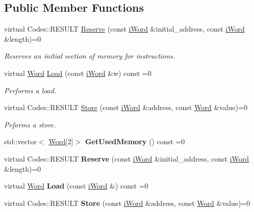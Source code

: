 \subsection*{Public Member Functions}
\begin{DoxyCompactItemize}
\item 
virtual Codes::RESULT \hyperlink{classiMemory_a27750e74d09fb473c163a4cc4c3e697b}{Reserve} (const \hyperlink{classiWord}{iWord} \&initial\_\-address, const \hyperlink{classiWord}{iWord} \&length)=0
\begin{DoxyCompactList}\small\item\em Reserves an initial section of memory for instructions. \item\end{DoxyCompactList}\item 
virtual \hyperlink{classWord}{Word} \hyperlink{classiMemory_a3352ba391fc9b69a0b8691b2d585596a}{Load} (const \hyperlink{classiWord}{iWord} \&w) const =0
\begin{DoxyCompactList}\small\item\em Performs a load. \item\end{DoxyCompactList}\item 
virtual Codes::RESULT \hyperlink{classiMemory_a2632c9999797b0799a7d6b0a59bfa91a}{Store} (const \hyperlink{classiWord}{iWord} \&address, const \hyperlink{classWord}{Word} \&value)=0
\begin{DoxyCompactList}\small\item\em Peforms a store. \item\end{DoxyCompactList}\item 
\hypertarget{classiMemory_aa9b57e00c0099963ab28489008d612e8}{
std::vector$<$ \hyperlink{classWord}{Word}\mbox{[}2\mbox{]}$>$ {\bfseries GetUsedMemory} () const =0}
\label{classiMemory_aa9b57e00c0099963ab28489008d612e8}

\item 
\hypertarget{classiMemory_a27750e74d09fb473c163a4cc4c3e697b}{
virtual Codes::RESULT {\bfseries Reserve} (const \hyperlink{classiWord}{iWord} \&initial\_\-address, const \hyperlink{classiWord}{iWord} \&length)=0}
\label{classiMemory_a27750e74d09fb473c163a4cc4c3e697b}

\item 
\hypertarget{classiMemory_a58fea9cebc1beb89503898d2d5f79bcd}{
virtual \hyperlink{classWord}{Word} {\bfseries Load} (const \hyperlink{classiWord}{iWord} \&) const =0}
\label{classiMemory_a58fea9cebc1beb89503898d2d5f79bcd}

\item 
\hypertarget{classiMemory_a2632c9999797b0799a7d6b0a59bfa91a}{
virtual Codes::RESULT {\bfseries Store} (const \hyperlink{classiWord}{iWord} \&address, const \hyperlink{classWord}{Word} \&value)=0}
\label{classiMemory_a2632c9999797b0799a7d6b0a59bfa91a}

\end{DoxyCompactItemize}


